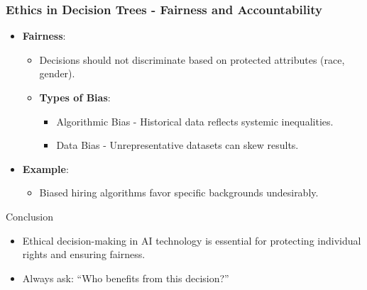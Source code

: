 \documentclass[aspectratio=169]{beamer}
\begin{document}
\begin{frame}[fragile]
    \frametitle{Ethics in Decision Trees - Fairness and Accountability}
    \begin{itemize}
        \item \textbf{Fairness}:
        \begin{itemize}
            \item Decisions should not discriminate based on protected attributes (race, gender).
            \item \textbf{Types of Bias}:
            \begin{itemize}
                \item Algorithmic Bias - Historical data reflects systemic inequalities.
                \item Data Bias - Unrepresentative datasets can skew results.
            \end{itemize}
        \end{itemize}
        \item \textbf{Example}:
        \begin{itemize}
            \item Biased hiring algorithms favor specific backgrounds undesirably.
        \end{itemize}
    \end{itemize}
    \begin{block}{Conclusion}
        \begin{itemize}
            \item Ethical decision-making in AI technology is essential for protecting individual rights and ensuring fairness.
            \item Always ask: ``Who benefits from this decision?''
        \end{itemize}
    \end{block}
\end{frame}
\end{document}
